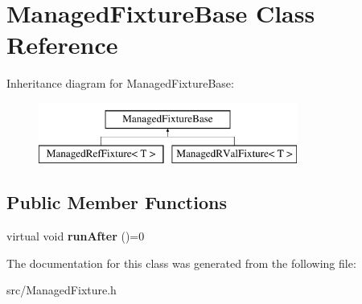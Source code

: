 \hypertarget{class_managed_fixture_base}{\section{Managed\-Fixture\-Base Class Reference}
\label{class_managed_fixture_base}
}
Inheritance diagram for Managed\-Fixture\-Base\-:\begin{figure}[H]
\begin{center}
\leavevmode
\includegraphics[height=2.000000cm]{class_managed_fixture_base}
\end{center}
\end{figure}
\subsection*{Public Member Functions}
\begin{DoxyCompactItemize}
\item 
\hypertarget{class_managed_fixture_base_a159d293ebbed3ee4391b90e5bab748d3}{virtual void {\bfseries run\-After} ()=0}\label{class_managed_fixture_base_a159d293ebbed3ee4391b90e5bab748d3}

\end{DoxyCompactItemize}


The documentation for this class was generated from the following file\-:\begin{DoxyCompactItemize}
\item 
src/Managed\-Fixture.\-h\end{DoxyCompactItemize}
